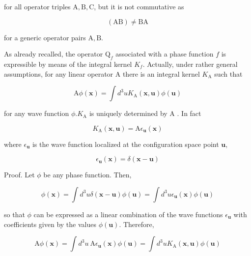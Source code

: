\documentclass{article}
\begin{document}
for all operator triples $\mathrm{A}, \mathrm{B}, \mathrm{C}$, but it is not commutative as
 
\begin{equation*}
(\mathrm{AB}) \neq \mathrm{BA} \tag{3.7.5}
\end{equation*}
 
for a generic operator pairs $\mathrm{A}, \mathrm{B}$.

As already recalled, the operator $\mathrm{Q}_{f}$ associated with a phase function $f$ is expressible by means of the integral kernel $K_{f}$. Actually, under rather general assumptions, for any linear operator A there is an integral kernel $K_{\mathrm{A}}$ such that
 
\begin{equation*}
\mathrm{A} \phi(\boldsymbol{x})=\int d^{3} u K_{\mathrm{A}}(\boldsymbol{x}, \boldsymbol{u}) \phi(\boldsymbol{u}) \tag{3.7.6}
\end{equation*}
 
for any wave function $\phi . K_{\mathrm{A}}$ is uniquely determined by A . In fact
 
\begin{equation*}
K_{\mathrm{A}}(\boldsymbol{x}, \boldsymbol{u})=\mathrm{A} \epsilon_{\boldsymbol{u}}(\boldsymbol{x}) \tag{3.7.7}
\end{equation*}
 
where $\epsilon_{\boldsymbol{u}}$ is the wave function localized at the configuration space point $\boldsymbol{u}$,
 
\begin{equation*}
\epsilon_{\boldsymbol{u}}(\boldsymbol{x})=\delta(\boldsymbol{x}-\boldsymbol{u}) \tag{3.7.8}
\end{equation*}
 

Proof. Let $\phi$ be any phase function. Then,
 
\begin{equation*}
\phi(\boldsymbol{x})=\int d^{3} u \delta(\boldsymbol{x}-\boldsymbol{u}) \phi(\boldsymbol{u})=\int d^{3} u \epsilon_{\boldsymbol{u}}(\boldsymbol{x}) \phi(\boldsymbol{u}) \tag{3.7.9}
\end{equation*}
 
so that $\phi$ can be expressed as a linear combination of the wave functions $\epsilon_{\boldsymbol{u}}$ with coefficients given by the values $\phi(\boldsymbol{u})$. Therefore,
 
\begin{equation*}
\mathrm{A} \phi(\boldsymbol{x})=\int d^{3} u \mathrm{~A} \epsilon_{\boldsymbol{u}}(\boldsymbol{x}) \phi(\boldsymbol{u})=\int d^{3} u K_{\mathrm{A}}(\boldsymbol{x}, \boldsymbol{u}) \phi(\boldsymbol{u}) \tag{3.7.10}
\end{equation*}
 
\end{document}
